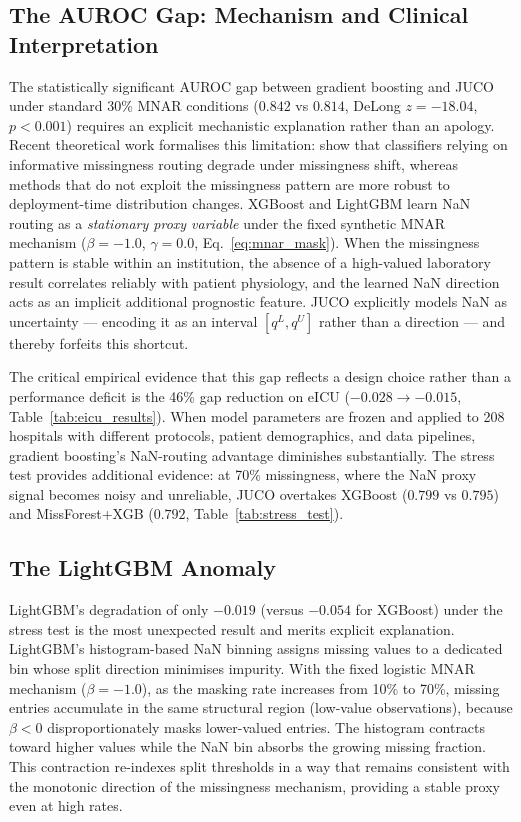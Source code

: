 \documentclass[a4paper,fleqn,longmktitle]{cas-sc}
\begin{document}
	\subsection{The AUROC Gap: Mechanism and Clinical Interpretation}
	\label{sec:auroc_gap}
	
	The statistically significant AUROC gap between gradient boosting
	and JUCO under standard 30\% MNAR conditions ($0.842$ vs $0.814$,
	DeLong $z = -18.04$, $p < 0.001$) requires an explicit mechanistic
	explanation rather than an apology.
	Recent theoretical work formalises this limitation:
	\citet{rockenschaub2024robust} show that classifiers relying on
	informative missingness routing degrade under missingness shift,
	whereas methods that do not exploit the missingness pattern are
	more robust to deployment-time distribution changes.
	XGBoost and LightGBM learn NaN routing as a \emph{stationary proxy
		variable} under the fixed synthetic MNAR mechanism
	($\beta = -1.0$, $\gamma = 0.0$, Eq.~\ref{eq:mnar_mask}).
	When the missingness pattern is stable within an institution,
	the absence of a high-valued laboratory result correlates reliably
	with patient physiology, and the learned NaN direction acts as an
	implicit additional prognostic feature.
	JUCO explicitly models NaN as uncertainty — encoding it as an
	interval $[q^L, q^U]$ rather than a direction — and thereby
	forfeits this shortcut.
	
	The critical empirical evidence that this gap reflects a
	design choice rather than a performance deficit is the 46\%
	gap reduction on eICU ($-0.028 \to -0.015$, Table~\ref{tab:eicu_results}).
	When model parameters are frozen and applied to 208 hospitals
	with different protocols, patient demographics, and data pipelines,
	gradient boosting's NaN-routing advantage diminishes substantially.
	The stress test provides additional evidence: at 70\% missingness,
	where the NaN proxy signal becomes noisy and unreliable, JUCO
	overtakes XGBoost ($0.799$ vs $0.795$) and MissForest+XGB ($0.792$,
	Table~\ref{tab:stress_test}).
	
	\subsection{The LightGBM Anomaly}
	\label{sec:lightgbm_anomaly}
	
	LightGBM's degradation of only $-0.019$ (versus $-0.054$ for XGBoost)
	under the stress test is the most unexpected result and merits
	explicit explanation.
	LightGBM's histogram-based NaN binning assigns missing values to
	a dedicated bin whose split direction minimises impurity.
	With the fixed logistic MNAR mechanism ($\beta = -1.0$), as the
	masking rate increases from 10\% to 70\%, missing entries
	accumulate in the same structural region (low-value observations),
	because $\beta < 0$ disproportionately masks lower-valued entries.
	The histogram contracts toward higher values while the NaN bin
	absorbs the growing missing fraction.
	This contraction re-indexes split thresholds in a way that remains
	consistent with the monotonic direction of the missingness
	mechanism, providing a stable proxy even at high rates.
	
\end{document}
